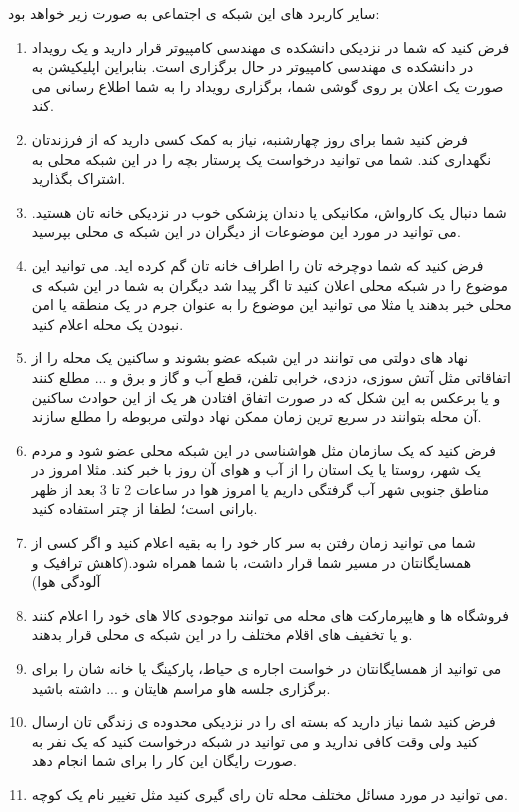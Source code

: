 سایر کاربرد های این شبکه ی اجتماعی به صورت زیر خواهد بود:

\begin{enumerate}
	\item 
	فرض کنید که شما در نزدیکی دانشکده ی مهندسی کامپیوتر قرار دارید و یک رویداد در دانشکده ی مهندسی کامپیوتر در حال برگزاری است. بنابراین اپلیکیشن به صورت یک اعلان بر روی گوشی شما، برگزاری رویداد را به شما اطلاع رسانی می کند.
	\item 
	فرض کنید شما برای روز چهارشنبه، نیاز به کمک کسی دارید که از فرزندتان نگهداری کند. شما می توانید درخواست یک پرستار بچه را در این شبکه محلی به اشتراک بگذارید.
	
	\item 
	شما دنبال یک کارواش، مکانیکی یا دندان پزشکی خوب در نزدیکی خانه تان هستید. می توانید در مورد این موضوعات از دیگران در این شبکه ی محلی بپرسید.
	\item 
	فرض کنید که شما دوچرخه تان را اطراف خانه تان گم کرده اید. می توانید این موضوع را در شبکه محلی اعلان کنید تا اگر پیدا شد دیگران به شما در این شبکه ی محلی خبر بدهند یا مثلا می توانید این موضوع را به عنوان جرم در یک منطقه یا امن نبودن یک محله اعلام کنید.
	
	\item 
	نهاد های دولتی می توانند در این شبکه عضو بشوند و ساکنین یک محله را از اتفاقاتی مثل آتش سوزی، دزدی، خرابی تلفن، قطع آب و گاز و برق و ... مطلع کنند و یا برعکس به این شکل که در صورت اتفاق افتادن هر یک از این حوادث ساکنین آن محله بتوانند در سریع ترین زمان ممکن نهاد دولتی مربوطه را مطلع سازند.
	
	\item 
	فرض کنید که یک سازمان مثل هواشناسی در این شبکه محلی عضو شود و مردم یک شهر، روستا یا یک استان را از آب و هوای آن روز با خبر کند. مثلا امروز در مناطق جنوبی شهر آب گرفتگی داریم یا امروز هوا در ساعات  2 تا 3 بعد از ظهر بارانی است؛ لطفا از چتر استفاده کنید.
	
	\item
	شما می توانید زمان رفتن به سر کار خود را به بقیه اعلام کنید و اگر کسی از همسایگانتان در مسیر شما قرار داشت، با شما همراه شود.(کاهش ترافیک و آلودگی هوا)
	\item 
	فروشگاه ها و هایپرمارکت های محله می توانند موجودی کالا های خود را اعلام کنند و یا تخفیف های اقلام مختلف را در این شبکه ی محلی قرار بدهند.
	\item 
	می توانید از همسایگانتان در خواست اجاره ی حیاط، پارکینگ یا خانه شان را برای برگزاری جلسه هاو مراسم هایتان و ... داشته باشید.
	\item 
	فرض کنید شما نیاز دارید که بسته ای را در نزدیکی محدوده ی زندگی تان ارسال کنید ولی وقت کافی ندارید و می توانید در شبکه درخواست کنید که یک نفر به صورت رایگان این کار را برای شما انجام دهد.
	\item 
	می توانید در مورد مسائل مختلف محله تان رای گیری کنید مثل تغییر نام یک کوچه.
	 
\end{enumerate}
 
